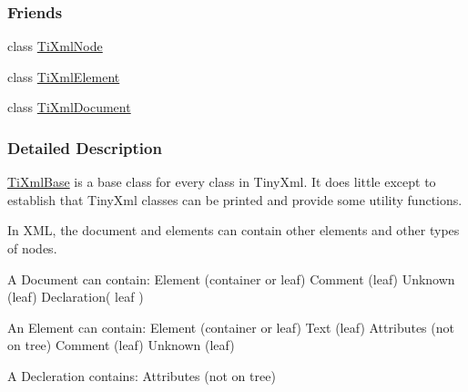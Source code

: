 \subsubsection*{Friends}
\begin{DoxyCompactItemize}
\item 
\hypertarget{class_ti_xml_base_a218872a0d985ae30e78c55adc4bdb196}{
class \hyperlink{class_ti_xml_base_a218872a0d985ae30e78c55adc4bdb196}{TiXmlNode}}
\label{class_ti_xml_base_a218872a0d985ae30e78c55adc4bdb196}

\item 
\hypertarget{class_ti_xml_base_ab6592e32cb9132be517cc12a70564c4b}{
class \hyperlink{class_ti_xml_base_ab6592e32cb9132be517cc12a70564c4b}{TiXmlElement}}
\label{class_ti_xml_base_ab6592e32cb9132be517cc12a70564c4b}

\item 
\hypertarget{class_ti_xml_base_a173617f6dfe902cf484ce5552b950475}{
class \hyperlink{class_ti_xml_base_a173617f6dfe902cf484ce5552b950475}{TiXmlDocument}}
\label{class_ti_xml_base_a173617f6dfe902cf484ce5552b950475}

\end{DoxyCompactItemize}


\subsubsection{Detailed Description}
\hyperlink{class_ti_xml_base}{TiXmlBase} is a base class for every class in TinyXml. It does little except to establish that TinyXml classes can be printed and provide some utility functions.

In XML, the document and elements can contain other elements and other types of nodes.

\begin{DoxyVerb}
	A Document can contain:	Element	(container or leaf)
							Comment (leaf)
							Unknown (leaf)
							Declaration( leaf )

	An Element can contain:	Element (container or leaf)
							Text	(leaf)
							Attributes (not on tree)
							Comment (leaf)
							Unknown (leaf)

	A Decleration contains: Attributes (not on tree)
	\end{DoxyVerb}
 


